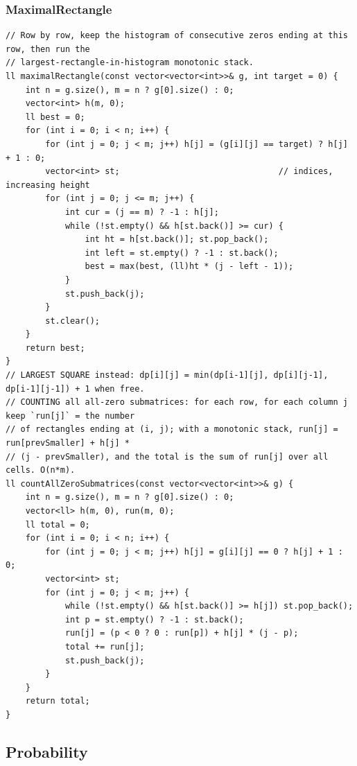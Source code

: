 \documentclass[9pt,a4paper,twocolumn]{extarticle}
\begin{document}
\filbreak
\subsubsection{MaximalRectangle}
\nopagebreak
\begin{lstlisting}
// Row by row, keep the histogram of consecutive zeros ending at this row, then run the
// largest-rectangle-in-histogram monotonic stack.
ll maximalRectangle(const vector<vector<int>>& g, int target = 0) {
    int n = g.size(), m = n ? g[0].size() : 0;
    vector<int> h(m, 0);
    ll best = 0;
    for (int i = 0; i < n; i++) {
        for (int j = 0; j < m; j++) h[j] = (g[i][j] == target) ? h[j] + 1 : 0;
        vector<int> st;                                // indices, increasing height
        for (int j = 0; j <= m; j++) {
            int cur = (j == m) ? -1 : h[j];
            while (!st.empty() && h[st.back()] >= cur) {
                int ht = h[st.back()]; st.pop_back();
                int left = st.empty() ? -1 : st.back();
                best = max(best, (ll)ht * (j - left - 1));
            }
            st.push_back(j);
        }
        st.clear();
    }
    return best;
}
// LARGEST SQUARE instead: dp[i][j] = min(dp[i-1][j], dp[i][j-1], dp[i-1][j-1]) + 1 when free.
// COUNTING all all-zero submatrices: for each row, for each column j keep `run[j]` = the number
// of rectangles ending at (i, j); with a monotonic stack, run[j] = run[prevSmaller] + h[j] *
// (j - prevSmaller), and the total is the sum of run[j] over all cells. O(n*m).
ll countAllZeroSubmatrices(const vector<vector<int>>& g) {
    int n = g.size(), m = n ? g[0].size() : 0;
    vector<ll> h(m, 0), run(m, 0);
    ll total = 0;
    for (int i = 0; i < n; i++) {
        for (int j = 0; j < m; j++) h[j] = g[i][j] == 0 ? h[j] + 1 : 0;
        vector<int> st;
        for (int j = 0; j < m; j++) {
            while (!st.empty() && h[st.back()] >= h[j]) st.pop_back();
            int p = st.empty() ? -1 : st.back();
            run[j] = (p < 0 ? 0 : run[p]) + h[j] * (j - p);
            total += run[j];
            st.push_back(j);
        }
    }
    return total;
}
\end{lstlisting}

\subsection{Probability}
\end{document}
